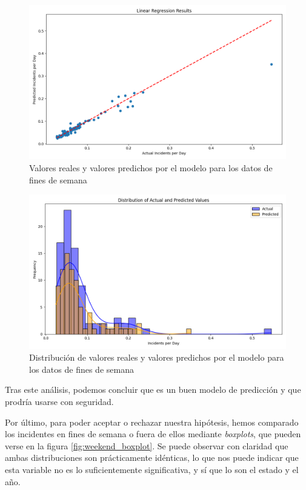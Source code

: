 \documentclass[11pt,a4paper]{article}
\begin{document}
\begin{figure}[H]
    \centering
    \includegraphics[width=.8\textwidth]{weekend_linear_regression_results.png}
    \caption{Valores reales y valores predichos por el modelo para los datos de fines de semana}
    \label{fig:weekend_reg_res}
\end{figure}

\begin{figure}[H]
    \centering
    \includegraphics[width=.8\linewidth]{weekend_linear_regression_distribution.png}
    \caption{Distribución de valores reales y valores predichos por el modelo para los datos de fines de semana}
    \label{fig:weekend_reg_dist}
\end{figure}

Tras este análisis, podemos concluir que es un buen modelo de predicción y que prodría usarse con seguridad.

Por último, para poder aceptar o rechazar nuestra hipótesis, hemos comparado los incidentes en fines de semana o fuera de ellos mediante \textit{boxplots}, que pueden verse en la figura \ref{fig:weekend_boxplot}. Se puede observar con claridad que ambas distribuciones son prácticamente idénticas, lo que nos puede indicar que esta variable no es lo suficientemente significativa, y sí que lo son el estado y el año.
\end{document}
